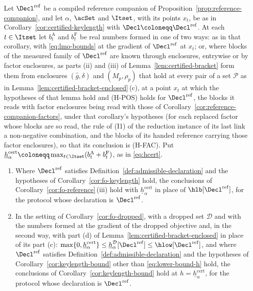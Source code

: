 \begin{corollary}\label{cor:certified-keylength-reference}
Let $\Decl^{\mathrm{ref}}$ be a compiled reference companion of
Proposition~\ref{prop:reference-companion}, and let $\alpha$, $\acSet$ and
$\Itset$, with its points $x_t$, be as in
Corollary~\ref{cor:certified-keylength} with
$\Decl\coloneqq\Decl^{\mathrm{ref}}$. At each $t\in\Itset$ let
$b^{\mathrm A}_t$ and $b^{\mathrm F}_t$ be real numbers formed in one of two
ways: as in that corollary, with \eqref{eq:lmo-bounds} at the gradient of
$\Decl^{\mathrm{ref}}$ at $x_t$; or, where blocks of the measured family of
$\Decl^{\mathrm{ref}}$ are known through enclosures, entrywise or by factor
enclosures, as parts (ii) and (iii) of Lemma~\ref{lem:certified-bracket} form
them from enclosures $(\hat g,\delta)$ and $(M_p,\rho_p)$ that hold at every
pair of a set $\mathcal P$ as in
Lemma~\ref{lem:certified-bracket-enclosed}\,(c), at a point $x_t$ at which
the hypotheses of that lemma hold and (H-POS) holds for
$\Decl^{\mathrm{ref}}$, the blocks it reads with factor enclosures being read
with those of Corollary~\ref{cor:reference-companion-factors}, under that
corollary's hypotheses (for each replaced factor whose blocks are so read,
the rule of (I1) of the reduction instance of its last link a non-negative
combination, and the blocks of its handed reference carrying those factor
enclosures), so that its conclusion is (H-FAC). Put $\underline{h}^{\mathrm{cert}}_{\alpha}\coloneqq
\max_{t\in\Itset}(b^{\mathrm A}_t+b^{\mathrm F}_t)$, as in \eqref{eq:hcert}.
\begin{enumerate}[label=(\roman*),leftmargin=2.4em]
\item Where $\Decl^{\mathrm{ref}}$ satisfies
  Definition~\ref{def:admissible-declaration} and the hypotheses of
  Corollary~\ref{cor:fo-keylength} hold, the conclusions of
  Corollary~\ref{cor:fo-reference}\,(iii) hold with
  $\underline{h}^{\mathrm{cert}}_{\alpha}$ in place of
  $\hlb[\Decl^{\mathrm{ref}}]$, for the protocol whose declaration is
  $\Decl^{\mathrm{ref}}$.
\item In the setting of Corollary~\ref{cor:fo-dropped}, with a dropped set
  $\mathcal{D}$ and with the numbers formed at the gradient of the dropped
  objective and, in the second way, with part (d) of
  Lemma~\ref{lem:certified-bracket-enclosed} in place of its part (c):
  $\max\{0,\underline{h}^{\mathrm{cert}}_{\alpha}\}\le
  \underline{h}^{\mathcal{D}}_{\alpha}[\Decl^{\mathrm{ref}}]\le
  \hlow[\Decl^{\mathrm{ref}}]$, and where $\Decl^{\mathrm{ref}}$ satisfies
  Definition~\ref{def:admissible-declaration} and the hypotheses of
  Corollary~\ref{cor:keylength-bound} other than \eqref{eq:lower-bound-h}
  hold, the conclusions of
  Corollary~\ref{cor:keylength-bound} hold at
  $h=\underline{h}^{\mathrm{cert}}_{\alpha}$, for the protocol whose
  declaration is $\Decl^{\mathrm{ref}}$.
\end{enumerate}
\end{corollary}

